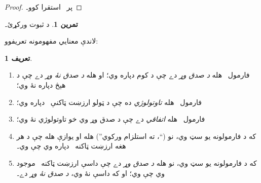 \documentclass[12pt,a4paper,oneside]{report}
\newcommand{\olfileid}[3]{\gdef\pspart{#1}\gdef\pschapter{#2}\gdef\pssection{#3}}
\gdef\pspart{#2}\gdef\pschapter{#3}\gdef\pssection{}%
\newcommand{\ollabel}[1]{\label{\pspart:\pschapter:\pssection:#1}}
\newtheorem{prop}[thm]{قضيه}
\theoremstyle{definition}
\newtheorem{defn}[thm]{تعريف}
\newtheorem{prob}[thm]{تمرين}
\begin{document}
\label{olpseg:OLP-0061-B020:start}
\label{olpseg:OLP-0061-B020:end}

\label{olpseg:OLP-0061-B021:start}
\begin{proof}
  پر~ استقرا کوو۔
\end{proof}
\label{olpseg:OLP-0061-B021:end}

\label{olpseg:OLP-0061-B022:start}
\begin{prob}
  د  ثبوت ورکړئ۔
\end{prob}
\label{olpseg:OLP-0061-B022:end}

\label{olpseg:OLP-0062-B004:start}
\olfileid{pl}{syn}{sem}
\label{olpseg:OLP-0062-B004:end}

\label{olpseg:OLP-0062-B005:start}
\label{olpseg:OLP-0062-B005:end}

\label{olpseg:OLP-0062-B006:start}
لاندې معنايي مفهومونه تعريفوو:
\label{olpseg:OLP-0062-B006:end}

\label{olpseg:OLP-0062-B007:start}
\begin{defn} 
\begin{enumerate}
\item فارمول~ هله \emph{د صدق وړ} دے چې د کوم
   دپاره  وي؛ او هله \emph{د صدق نۀ وړ}
  دے چې د هېڅ  دپاره  نۀ وي؛
\item فارمول~ هله \emph{تاوتولوژي} ده چې د ټولو
  ارزښت ټاکنې~ دپاره  وي؛
\item فارمول~ هله \emph{اتفاقي} دے چې د صدق وړ وي خو
  تاوتولوژي نۀ وي؛
\item که \LR{$\Gamma$} د فارمولونه يو سټ وي، نو 
  (``\LR{$\Gamma$}،  ته استلزام ورکوي'') هله او يوازې هله چې د هر
  هغه ارزښت ټاکنه~ دپاره  وي چې
   وي۔
\item که \LR{$\Gamma$} د فارمولونه يو سټ وي، نو \LR{$\Gamma$} هله
  \emph{د صدق وړ} دے چې داسې ارزښت ټاکنه~ موجود وي
  چې  وي؛ او که داسې نۀ وي، \LR{$\Gamma$}
  \emph{د صدق نۀ وړ} دے۔
\end{enumerate} 
\end{defn}
\label{olpseg:OLP-0062-B007:end}
\end{document}
